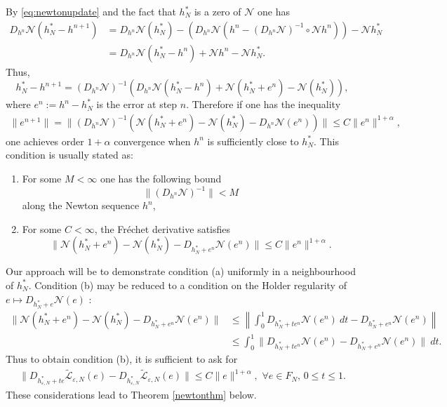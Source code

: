 \documentclass[12pt]{article}
\def\L{\mathcal{L}}
\newcommand{\eps}{\varepsilon}
\theoremstyle{plain}
\begin{document}
{By \eqref{eq:newtonupdate} and the fact that $h^*_N$ is a zero of $\mathcal{N}$ one has 
\begin{align*}
D_{h^n}\mathcal{N}(  
    h^*_N-h^{n+1})&=D_{h^n}\mathcal{N}(h^*_N) -(D_{h^n}\mathcal{N}(h^n-(D_{h^n}\mathcal{N})^{-1}\circ \mathcal{N}h^n))-\mathcal{N}h^*_N\nonumber\\
    &=D_{h^n}\mathcal{N}(h^*_N - h^n) +\mathcal{N}h^n-\mathcal{N}h^*_N.
\end{align*}
Thus, 
\begin{equation*}
    h^*_N-h^{n+1} =(D_{h^n}\mathcal{N})^{-1}\left(D_{h^n}\mathcal{N}(h^*_N-h^n)+\mathcal{N}(h^*_N+e^n)-\mathcal{N}(h^*_N)\right),
\end{equation*}
where $e^n:=h^n-h_N^*$ is the error at step $n$.
Therefore if one has the inequality
\begin{align*}
\|e^{n+1}\|=\|(D_{h^n}\mathcal{N})^{-1}\left(\mathcal{N}(h^*_N+e^n)-\mathcal{N}(h^*_N)- D_{h^n}\mathcal{N}(e^n)\right)\|\le C\|e^n\|^{1+\alpha},
\end{align*}
one achieves order $1+\alpha$ convergence when $h^n$ is sufficiently close to $h_N^*$.
This condition is usually stated as:
\begin{enumerate}
    \item[a)] For some $M<\infty$ one has the following bound 
    \begin{equation}
        \label{eq:resolventnewton}
    \|(D_{h^n}\mathcal{N})^{-1}\|<M
    \end{equation}  along the Newton sequence $h^n$,
    \item[b)] For some $C<\infty$, the Fr\'echet derivative satisfies 
    \begin{equation}
        \label{eq:Frechetcondition}
    \|\mathcal{N}(h^*_N+e^n)-\mathcal{N}(h^*_N)- D_{h^*_N+e^n}\mathcal{N}(e^n)\|\le C\|e^n\|^{1+\alpha}.
    \end{equation}
\end{enumerate}
Our approach will be to demonstrate condition (a) uniformly in a neighbourhood of $h_N^*$.
Condition (b) may be reduced to a condition on the Holder regularity of $e \mapsto D_{h^*_N+e}\mathcal{N}(e)$ :
\begin{align*} 
    \|\mathcal{N}(h^*_N+e^n)-\mathcal{N}(h^*_N)- D_{h^*_N+e^n}\mathcal{N}(e^n)\|& \le \left\|\int_0^1D_{h^*_N+te^n}\mathcal{N}(e^n)\ dt- D_{h^*_N+e^n}\mathcal{N}(e^n)\right\|\nonumber\\
    &\leq \int_0^1\|D_{h^*_N+te^n}\mathcal{N}(e^n)- D_{h^*_N+e^n}\mathcal{N}(e^n)\|\ dt.
    \end{align*}
Thus to obtain condition (b), it is sufficient to ask for 
 \begin{align}\label{eq:Frechetderivreg}
\|D_{h^*_{\eps,N}+te}\tilde{\L}_{\eps,N}(e)- D_{h^*_{\eps,N}}\tilde{\L}_{\eps,N}(e)\|\le C\|e\|^{1+\alpha}, \,\,  \forall e\in F_N, \, 0\le t\le 1.    
 \end{align}
These considerations lead to Theorem \ref{newtonthm} below.

}
\end{document}
